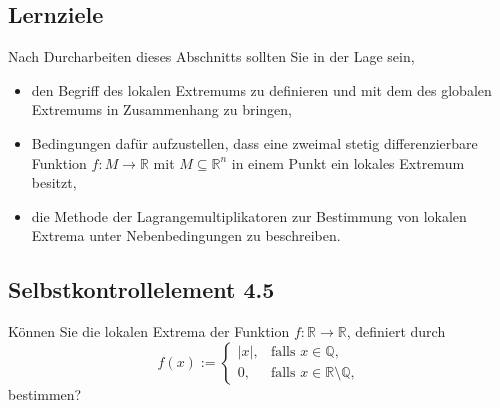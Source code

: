 \documentclass[a4paper,12pt]{article}
\begin{document}
\subsection*{Lernziele}

Nach Durcharbeiten dieses Abschnitts sollten Sie in der Lage sein,
\begin{itemize}
  \item den Begriff des lokalen Extremums zu definieren und mit dem des globalen
        Extremums in Zusammenhang zu bringen,
  \item Bedingungen dafür aufzustellen, dass eine zweimal stetig differenzierbare
        Funktion $f: M \to \mathbb{R}$ mit $M \subseteq \mathbb{R}^n$ in einem Punkt ein
        lokales Extremum besitzt,
  \item die Methode der Lagrangemultiplikatoren zur Bestimmung von lokalen
        Extrema unter Nebenbedingungen zu beschreiben.
\end{itemize}

\subsection*{Selbstkontrollelement 4.5}

Können Sie die lokalen Extrema der Funktion $f: \mathbb{R} \to \mathbb{R}$, definiert durch
\[
  f(x) := \begin{cases} |x|, & \text{falls } x \in \mathbb{Q}, \\ 0, & \text{falls } x \in \mathbb{R} \setminus \mathbb{Q}, \end{cases}
\]
bestimmen?
\end{document}
